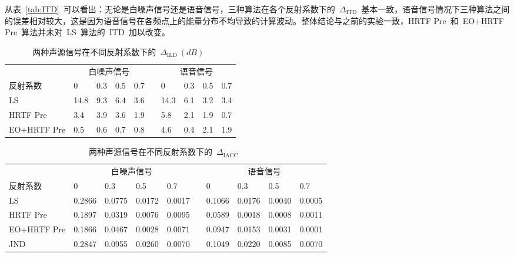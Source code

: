 从表~\ref{tab:ITD}~可以看出：无论是白噪声信号还是语音信号，三种算法在各个反射系数下的~$\Delta_{\text{ITD}}$~基本一致，语音信号情况下三种算法之间的误差相对较大，这是因为语音信号在各频点上的能量分布不均导致的计算波动。整体结论与之前的实验一致，HRTF Pre~和~EO+HRTF Pre~算法并未对~LS~算法的~ITD~加以改变。


\begin{table}[H]
  \centering
  \caption{两种声源信号在不同反射系数下的~$\Delta_{\text{ILD}}~(dB)$~}
  {
    \begin{tabular}{m{3cm}<{\centering}m{1cm}<{\centering}m{1cm}<{\centering}m{1cm}<{\centering}m{1cm}<{\centering}m{0.2cm}<{\centering}m{1cm}<{\centering}m{1cm}<{\centering}m{1cm}<{\centering}m{1cm}<{\centering}}
    \toprule[1.5pt]
     & \multicolumn{4}{c}{白噪声信号}~ & & \multicolumn{4}{c}{语音信号} \\
    \cmidrule{2-5}  \cmidrule{7-10}
    反射系数                    & 0     & 0.3   & 0.5   & 0.7  & & 0     & 0.3   & 0.5   & 0.7 \\ \hline
    LS            & 14.8  & 9.3   & 6.4   & 3.6  & & 14.3  & 6.1   & 3.2   & 3.4  \\ \hline
    HRTF Pre      & 3.4   & 3.9   & 3.6   & 1.9  & & 5.8   & 2.1   & 1.9   & 0.7 \\ \hline
    EO+HRTF Pre   & 0.5   & 0.6   & 0.7   & 0.8  & & 4.6   & 0.4   & 2.1   & 1.9 \\
    \toprule[1.5pt]
    \end{tabular}%
  }
  \label{tab:ILD}%
\end{table}%


\begin{table}[H]
  \centering
  \caption{两种声源信号在不同反射系数下的~$\Delta_{\text{IACC}}$~}
  {
    \begin{tabular}{m{3cm}<{\centering}m{1cm}<{\centering}m{1cm}<{\centering}m{1cm}<{\centering}m{1cm}<{\centering}m{0.2cm}<{\centering}m{1cm}<{\centering}m{1cm}<{\centering}m{1cm}<{\centering}m{1cm}<{\centering}}
    \toprule[1.5pt]
     & \multicolumn{4}{c}{白噪声信号}~ & & \multicolumn{4}{c}{语音信号} \\
    \cmidrule{2-5}  \cmidrule{7-10}
    反射系数                    & 0       & 0.3     & 0.5     & 0.7     & & 0       & 0.3     & 0.5     & 0.7 \\ \hline
    LS            & 0.2866  & 0.0775  & 0.0172  & 0.0017  & & 0.1066  & 0.0176  & 0.0040  & 0.0005  \\ \hline
    HRTF Pre      & 0.1897  & 0.0319  & 0.0076  & 0.0095  & & 0.0589  & 0.0018  & 0.0008  & 0.0011 \\ \hline
    EO+HRTF Pre   & 0.1866  & 0.0467  & 0.0028  & 0.0071  & & 0.0947  & 0.0153  & 0.0031  & 0.0001 \\ \hline
    JND           & 0.2847  & 0.0955  & 0.0260  & 0.0070  & & 0.1049  & 0.0220  & 0.0085  & 0.0070 \\
    \toprule[1.5pt]
    \end{tabular}%
  }
  \label{tab:IACC}%
\end{table}%

